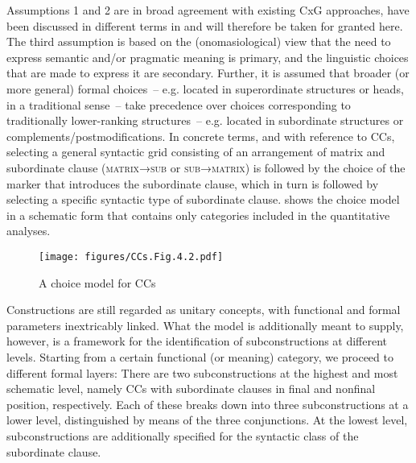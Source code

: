 Assumptions 1 and 2 are in broad agreement with existing CxG approaches, have been discussed in different terms in  and will therefore be taken for granted here. The third assumption is based on the (onomasiological) view that the need to express semantic and/or pragmatic meaning is primary, and the linguistic choices that are made to express it are secondary. Further, it is assumed that broader (or more general) formal choices~– e.g. located in superordinate structures or heads, in a traditional sense~– take precedence over choices corresponding to traditionally lower-ranking structures~– e.g. located in subordinate structures or complements/postmodifications. In concrete terms, and with reference to CCs, selecting a general syntactic grid consisting of an arrangement of matrix and subordinate clause (\textsc{matrix}→\textsc{sub} or \textsc{sub}→\textsc{matrix}) is followed by the choice of the marker that introduces the subordinate clause, which in turn is followed by selecting a specific syntactic type of subordinate clause.  shows the choice model in a schematic form that contains only categories included in the quantitative analyses.

\begin{figure}
\texttt{[image: figures/CCs.Fig.4.2.pdf]}
\caption{\label{bkm:Ref35424208}\label{fig:4.2}A choice model for CCs}
\end{figure}

Constructions are still regarded as unitary concepts, with functional and formal parameters inextricably linked. What the model is additionally meant to supply, however, is a framework for the identification of subconstructions at different levels. Starting from a certain functional (or meaning) category, we proceed to different formal layers: There are two subconstructions at the highest and most schematic level, namely CCs with subordinate clauses in final and nonfinal position, respectively. Each of these breaks down into three subconstructions at a lower level, distinguished by means of the three conjunctions. At the lowest level, subconstructions are additionally specified for the syntactic class of the subordinate clause.

